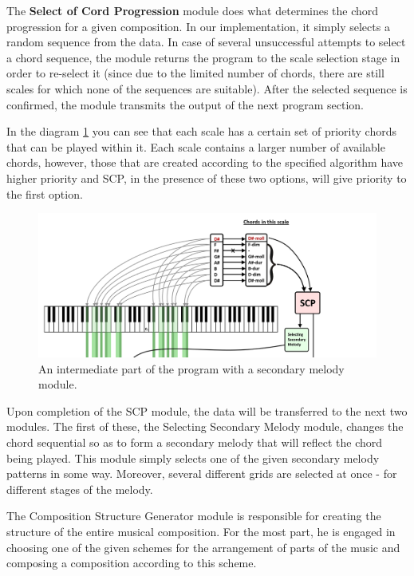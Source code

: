\documentclass[thesis=B,english]{FITthesis}[2019/12/23]
\begin{document}
The \textbf{Select of Cord Progression} module does what determines the chord progression for a given composition. In our implementation, it simply selects a random sequence from the data. In case of several unsuccessful attempts to select a chord sequence, the module returns the program to the scale selection stage in order to re-select it (since due to the limited number of chords, there are still scales for which none of the sequences are suitable). After the selected sequence is confirmed, the module transmits the output of the next program section.

In the diagram \ref{fig:Theory4} you can see that each scale has a certain set of priority chords that can be played within it. Each scale contains a larger number of available chords, however, those that are created according to the specified algorithm have higher priority and SCP, in the presence of these two options, will give priority to the first option.

\begin{figure}[ht]
            \includegraphics[width=\textwidth]{Theory4.png}
            \caption{An intermediate part of the program with a secondary melody module.}
            \label{fig:Theory4}
\end{figure}

Upon completion of the SCP module, the data will be transferred to the next two modules. The first of these, the Selecting Secondary Melody module, changes the chord sequential so as to form a secondary melody that will reflect the chord being played. This module simply selects one of the given secondary melody patterns in some way. Moreover, several different grids are selected at once - for different stages of the melody.

The Composition Structure Generator module is responsible for creating the structure of the entire musical composition. For the most part, he is engaged in choosing one of the given schemes for the arrangement of parts of the music and composing a composition according to this scheme.
\end{document}
